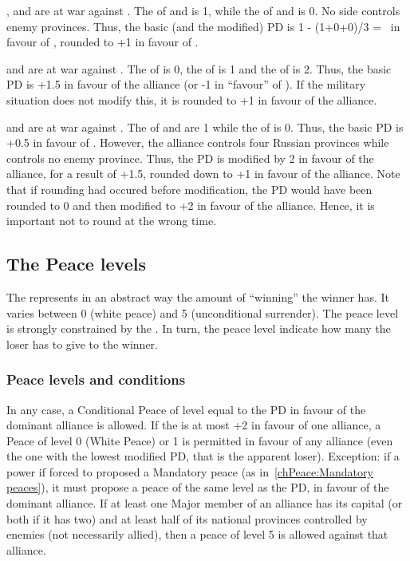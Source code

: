 \begin{exemple}[Rounding PD]
  \SUE, \POL and \TUR are at war against \RUS. The \STAB of \RUS and \SUE is
  1, while the \STAB of \POL and \TUR is 0. No side controls enemy
  provinces. Thus, the basic (and the modified) PD is 1 - (1+0+0)/3 = \td\ in
  favour of \RUS, rounded to +1 in favour of \RUS.
  
  \smallskip

  \SUE and \TUR are at war against \RUS. The \STAB of \RUS is 0, the \STAB of
  \TUR is 1 and the \STAB of \SUE is 2. Thus, the basic PD is +1.5 in favour
  of the alliance (or -1 in ``favour'' of \RUS). If the military situation
  does not modify this, it is rounded to +1 in favour of the alliance.

  \smallskip

  \SUE and \TUR are at war against \RUS. The \STAB of \RUS and \TUR are 1
  while the \STAB of \SUE is 0. Thus, the basic PD is +0.5 in favour of
  \RUS. However, the alliance controls four Russian provinces while \RUS
  controls no enemy province. Thus, the PD is modified by 2 in favour of the
  alliance, for a result of +1.5, rounded down to +1 in favour of the
  alliance. Note that if rounding had occured before modification, the PD
  would have been rounded to 0 and then modified to +2 in favour of the
  alliance. Hence, it is important not to round at the wrong time.
\end{exemple}

\subsection{The Peace levels}
The  represents in an abstract way the amount of
``winning'' the winner has. It varies between 0 (white peace) and 5
(unconditional surrender). The peace level is strongly constrained by the
. In turn, the peace level indicate how many
 the loser has to give to the winner.

\subsubsection{Peace levels and conditions}
\bparag In any case, a Conditional Peace of level equal to the PD in favour of
the dominant alliance is allowed. %
\bparag If the  is at most +2 in favour of one
alliance, a Peace of level 0 (White Peace) or 1 is permitted in favour of any
alliance (even the one with the lowest modified PD, that is the apparent
loser).
\bparag Exception: if a power if forced to proposed a Mandatory peace (as
in~\ref{chPeace:Mandatory peaces}), it must propose a peace of the same level
as the PD, in favour of the dominant alliance.
\bparag If at least one Major member of an alliance has its capital (or both
if it has two) and at least half of its national provinces controlled by
enemies (not necessarily allied), then a peace of level 5 is allowed against
that alliance.

